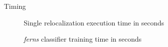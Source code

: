 \begin{frame}[t]{Timing}

  \begin{figure}[htpb]
    \centering
    \begin{bchart}[steps={0.2,0.4,0.6,0.8,1},max=1]
    \end{bchart}
    \caption{Single relocalization execution time in seconds}
    \label{fig:exec_time}
  \end{figure}


  \begin{figure}[htpb]
    \centering
    \begin{bchart}[step=10, max=70]
    \end{bchart}
    \caption{\textit{ferns} classifier training time in seconds}
    \label{fig:training_time}
  \end{figure}
\end{frame}
%
%
